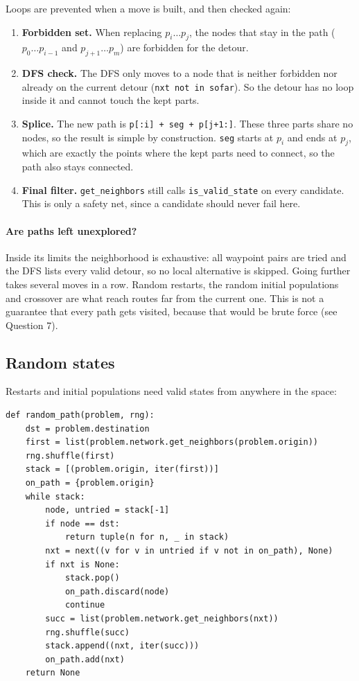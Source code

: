 \documentclass[11pt,a4paper]{article}
\newcommand{\col}[1]{\texttt{#1}}
\begin{document}
Loops are prevented when a move is built, and then checked again:

\begin{enumerate}
  \item \textbf{Forbidden set.} When replacing $p_i \dots p_j$, the nodes that stay in the path
  ($p_0 \dots p_{i-1}$ and $p_{j+1} \dots p_m$) are forbidden for the detour.
  \item \textbf{DFS check.} The DFS only moves to a node that is neither forbidden nor already on
  the current detour (\col{nxt not in sofar}). So the detour has no loop inside it and cannot touch
  the kept parts.
  \item \textbf{Splice.} The new path is \col{p[:i] + seg + p[j+1:]}. These three parts share no
  nodes, so the result is simple by construction. \col{seg} starts at $p_i$ and ends at $p_j$, which
  are exactly the points where the kept parts need to connect, so the path also stays connected.
  \item \textbf{Final filter.} \col{get\_neighbors} still calls \col{is\_valid\_state} on every
  candidate. This is only a safety net, since a candidate should never fail here.
\end{enumerate}

\paragraph{Are paths left unexplored?}
Inside its limits the neighborhood is exhaustive: all waypoint pairs are tried and the DFS lists
every valid detour, so no local alternative is skipped. Going further takes several moves in a
row. Random restarts, the random initial populations and crossover are what reach routes far from
the current one. This is not a guarantee that every path gets visited, because that would be brute
force (see Question 7).

\subsection{Random states}

Restarts and initial populations need valid states from anywhere in the space:

\begin{lstlisting}
def random_path(problem, rng):
    dst = problem.destination
    first = list(problem.network.get_neighbors(problem.origin))
    rng.shuffle(first)
    stack = [(problem.origin, iter(first))]
    on_path = {problem.origin}
    while stack:
        node, untried = stack[-1]
        if node == dst:
            return tuple(n for n, _ in stack)
        nxt = next((v for v in untried if v not in on_path), None)
        if nxt is None:
            stack.pop()
            on_path.discard(node)
            continue
        succ = list(problem.network.get_neighbors(nxt))
        rng.shuffle(succ)
        stack.append((nxt, iter(succ)))
        on_path.add(nxt)
    return None
\end{lstlisting}
\end{document}
